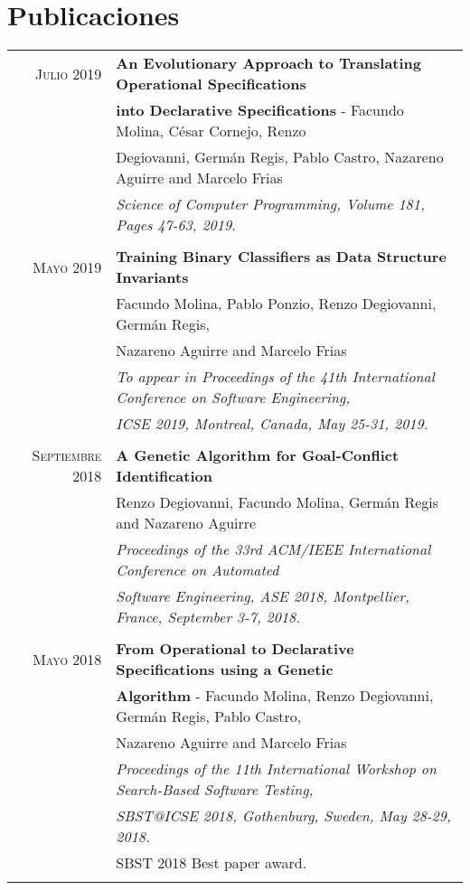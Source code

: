 \documentclass[a4paper,10pt]{article} %
\begin{document}
\section{Publicaciones}
\begin{longtable}{rl}

\textsc{Julio} 2019  & \textbf{An Evolutionary Approach to Translating Operational Specifications} \\ & \textbf{into Declarative Specifications} - Facundo Molina, César Cornejo, Renzo\\ 
& Degiovanni, Germán Regis, Pablo Castro, Nazareno Aguirre and Marcelo Frias \\
& \textit{Science of Computer Programming, Volume 181, Pages 47-63, 2019.} \\ & \\

\textsc{Mayo} 2019  & \textbf{Training Binary Classifiers as Data Structure Invariants} \\ 
& Facundo Molina, Pablo Ponzio, Renzo Degiovanni, Germán Regis, \\ 
& Nazareno Aguirre and Marcelo Frias \\
& \textit{To appear in Proceedings of the 41th International Conference on Software Engineering,} \\
& \textit{ICSE 2019, Montreal, Canada, May 25-31, 2019.} \\ & \\

\textsc{Septiembre} 2018  & \textbf{A Genetic Algorithm for Goal-Conflict Identification} \\ 
& Renzo Degiovanni, Facundo Molina, Germán Regis and Nazareno Aguirre \\
& \textit{Proceedings of the 33rd ACM/IEEE International Conference on Automated } \\
& \textit{Software Engineering, ASE 2018, Montpellier, France, September 3-7, 2018.} \\ & \\

\textsc{Mayo} 2018  & \textbf{From Operational to Declarative Specifications using a Genetic} \\ & \textbf{Algorithm} - Facundo Molina, Renzo Degiovanni, Germán Regis, Pablo Castro,\\
& Nazareno Aguirre and Marcelo Frias \\
& \textit{Proceedings of the 11th International Workshop on Search-Based Software Testing,} \\
& \textit{SBST@ICSE 2018, Gothenburg, Sweden, May 28-29, 2018.} \\
& SBST 2018 Best paper award. \\ & \\


\end{longtable}
\end{document}
